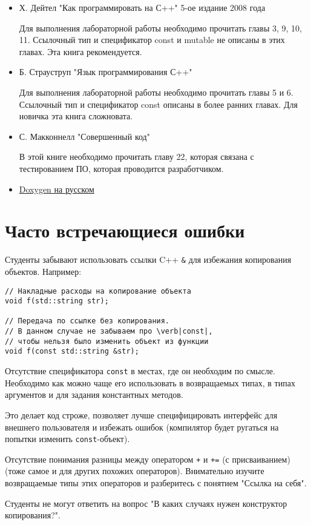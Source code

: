 \documentclass[a4paper,12pt]{article}
\begin{document}
\begin{itemize}
\item Х. Дейтел "Как программировать на С++" 5-ое издание 2008 года

  Для выполнения лабораторной работы необходимо прочитать главы 3, 9,
  10, 11. Ссылочный тип и спецификатор const и mutable не описаны в
  этих главах. Эта книга рекомендуется.

\item Б. Страуструп "Язык программирования С++"

  Для выполнения лабораторной работы необходимо прочитать главы 5 и
  6. Ссылочный тип и спецификатор const описаны в более ранних
  главах. Для новичка эта книга сложновата.

\item С. Макконнелл "Совершенный код"

  В этой книге необходимо прочитать главу 22, которая связана с
  тестированием ПО, которая проводится разработчиком.

\item \href{http://doxygenorg.ru/old/}{Doxygen на русском}

\end{itemize}

\section{Часто встречающиеся ошибки}

Студенты забывают использовать ссылки C++ \lstinline|&| для избежания
копирования объектов. Например:
\begin{lstlisting}[texcl]
// Накладные расходы на копирование объекта
void f(std::string str);

// Передача по ссылке без копирования.
// В данном случае не забываем про \verb|const|,
// чтобы нельзя было изменить объект из функции
void f(const std::string &str);
\end{lstlisting}

Отсутствие спецификатора \lstinline|const| в местах, где он необходим
по смысле. Необходимо как можно чаще его использовать в возвращаемых
типах, в типах аргументов и для задания константных методов.

Это делает код строже, позволяет лучше специфицировать интерфейс для
внешнего пользователя и избежать ошибок (компилятор будет ругаться на
попытки изменить \lstinline|const|-объект).

Отсутствие понимания разницы между оператором \lstinline|+| и
\lstinline|+=| (с присваиванием) (тоже самое и для других похожих
операторов). Внимательно изучите возвращаемые типы этих операторов и
разберитесь с понятием "Ссылка на себя".

Студенты не могут ответить на вопрос "В каких случаях нужен
конструктор копирования?".
\end{document}
